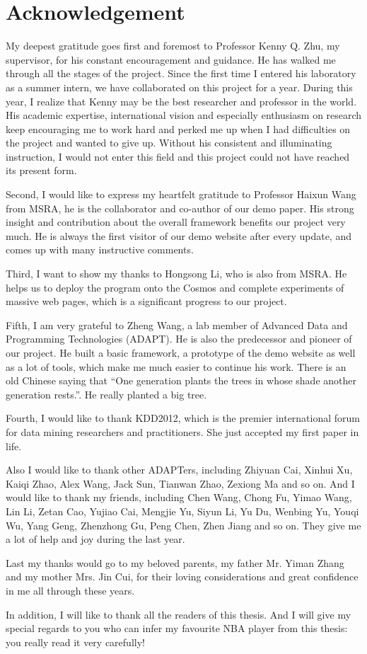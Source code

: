 \chapter*{Acknowledgement}
{}

\label{sec:ack}

My deepest gratitude goes first and foremost to Professor Kenny Q. Zhu, my supervisor, for his constant encouragement and guidance. 
He has walked me through all the stages of the project. 
Since the first time I entered his laboratory as a summer intern, we have collaborated on this project for a year.
During this year, I realize that Kenny may be the best researcher and professor in the world. His academic expertise, international vision and especially enthusiasm on research keep encouraging me to work hard and perked me up when I had difficulties on the project and wanted to give up.
Without his consistent and illuminating instruction, I would not enter this field and this project could not have reached its present form.

Second, I would like to express my heartfelt gratitude to Professor Haixun Wang from MSRA, he is the collaborator and co-author of our demo paper. 
His strong insight and contribution about the overall framework benefits our project very much.
He is always the first visitor of our demo website after every update, and comes up with many instructive comments.

Third, I want to show my thanks to Hongsong Li, who is also from MSRA. He helps us to deploy the program onto the Cosmos and complete experiments of massive web pages, which is a significant progress to our project. 

Fifth, I am very grateful to Zheng Wang, a lab member of Advanced Data and Programming Technologies (ADAPT). He is also the predecessor and pioneer of our project. He built a basic framework, a prototype of the demo website as well as a lot of tools, which make me much easier to continue his work.
There is an old Chinese saying that ``One generation plants the trees in whose shade another generation rests.''. He really planted a big tree.

Fourth, I would like to thank KDD2012, which is the premier international forum for data mining researchers and practitioners. She just accepted my first paper in life.

Also I would like to thank other ADAPTers, including Zhiyuan Cai, Xinhui Xu, Kaiqi Zhao, Alex Wang, Jack Sun, Tianwan Zhao, Zexiong Ma and so on. And I would like to thank my friends, including Chen Wang, Chong Fu, Yimao Wang, Lin Li, Zetan Cao, Yujiao Cai, Mengjie Yu, Siyun Li, Yu Du, Wenbing Yu, Youqi Wu, Yang Geng, Zhenzhong Gu, Peng Chen, Zhen Jiang and so on. They give me a lot of help and joy during the last year.

Last my thanks would go to my beloved parents, my father Mr. Yiman Zhang and my mother Mrs. Jin Cui, for their loving considerations and great confidence in me all through these years.

In addition, I will like to thank all the readers of this thesis. And I will give my special regards to you who can infer my favourite NBA player from this thesis: you really read it very carefully! 